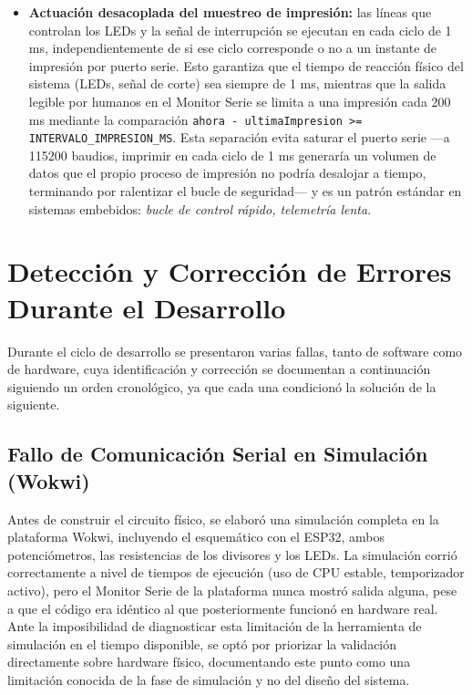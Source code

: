 \documentclass[12pt, letterpaper]{article}
\begin{document}
\begin{itemize}
		\item \textbf{Actuación desacoplada del muestreo de impresión:} las líneas que controlan los LEDs y la señal de interrupción se ejecutan en cada ciclo de 1 ms, independientemente de si ese ciclo corresponde o no a un instante de impresión por puerto serie. Esto garantiza que el tiempo de reacción físico del sistema (LEDs, señal de corte) sea siempre de 1 ms, mientras que la salida legible por humanos en el Monitor Serie se limita a una impresión cada 200 ms mediante la comparación \texttt{ahora - ultimaImpresion >= INTERVALO\_IMPRESION\_MS}. Esta separación evita saturar el puerto serie —a 115200 baudios, imprimir en cada ciclo de 1 ms generaría un volumen de datos que el propio proceso de impresión no podría desalojar a tiempo, terminando por ralentizar el bucle de seguridad— y es un patrón estándar en sistemas embebidos: \textit{bucle de control rápido, telemetría lenta}.
	\end{itemize}
	
	\section{Detección y Corrección de Errores Durante el Desarrollo}
	Durante el ciclo de desarrollo se presentaron varias fallas, tanto de software como de hardware, cuya identificación y corrección se documentan a continuación siguiendo un orden cronológico, ya que cada una condicionó la solución de la siguiente.
	
	\subsection{Fallo de Comunicación Serial en Simulación (Wokwi)}
	Antes de construir el circuito físico, se elaboró una simulación completa en la plataforma Wokwi, incluyendo el esquemático con el ESP32, ambos potenciómetros, las resistencias de los divisores y los LEDs. La simulación corrió correctamente a nivel de tiempos de ejecución (uso de CPU estable, temporizador activo), pero el Monitor Serie de la plataforma nunca mostró salida alguna, pese a que el código era idéntico al que posteriormente funcionó en hardware real. Ante la imposibilidad de diagnosticar esta limitación de la herramienta de simulación en el tiempo disponible, se optó por priorizar la validación directamente sobre hardware físico, documentando este punto como una limitación conocida de la fase de simulación y no del diseño del sistema.
	
\end{document}
